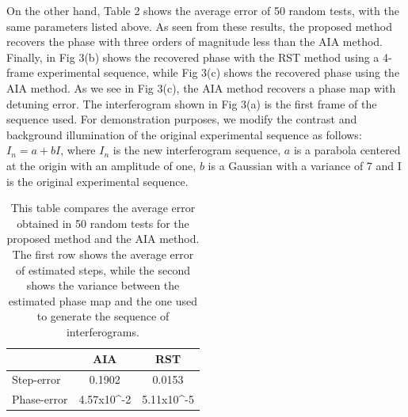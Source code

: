 \documentclass[letterpaper,12pt]{article}   %
\begin{document}
On the other hand, Table 2 shows the average error of 50 random tests,
with the same parameters listed above. As seen from these results, the
proposed method recovers the phase with three orders of magnitude less
than the AIA method.  Finally, in Fig 3(b) shows the recovered phase
with the RST method using a 4-frame experimental sequence, while Fig
3(c) shows the recovered phase using the AIA method. As we see in Fig
3(c), the AIA method recovers a phase map with detuning error.  The
interferogram shown in Fig 3(a) is the first frame of the sequence
used. For demonstration purposes, we modify the contrast and
background illumination of the original experimental sequence as
follows: $I_n=a+bI$, where $I_n$ is the new interferogram sequence,
$a$ is a parabola centered at the origin with an amplitude of one, $b$
is a Gaussian with a variance of 7 and I is the original experimental
sequence.
\begin{table}
  \begin{center}
    \begin{tabular}{|l|c|c|}
      \hline
      & AIA    & RST 	    \\ \hline \hline
      Step-error  & 0.1902 & 0.0153	\\ \hline
      Phase-error & 4.57x10^{-2} & 5.11x10^{-5} \\ \hline
    \end{tabular}
  \end{center}
  \caption{This table compares the average error obtained in 50 random tests for the
    proposed method and the AIA method. The first row shows the average error of
    estimated steps, while the second shows the variance between the estimated phase map
    and the one used to generate the sequence of interferograms.} 
  \label{Tab:mean-phase_error}
\end{table}
\end{document}
